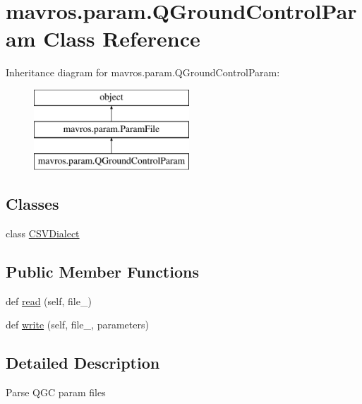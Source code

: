 \hypertarget{classmavros_1_1param_1_1QGroundControlParam}{}\section{mavros.\+param.\+Q\+Ground\+Control\+Param Class Reference}
\label{classmavros_1_1param_1_1QGroundControlParam}
Inheritance diagram for mavros.\+param.\+Q\+Ground\+Control\+Param\+:\begin{figure}[H]
\begin{center}
\leavevmode
\includegraphics[height=3.000000cm]{classmavros_1_1param_1_1QGroundControlParam}
\end{center}
\end{figure}
\subsection*{Classes}
\begin{DoxyCompactItemize}
\item 
class \mbox{\hyperlink{classmavros_1_1param_1_1QGroundControlParam_1_1CSVDialect}{C\+S\+V\+Dialect}}
\end{DoxyCompactItemize}
\subsection*{Public Member Functions}
\begin{DoxyCompactItemize}
\item 
def \mbox{\hyperlink{classmavros_1_1param_1_1QGroundControlParam_af1e7488ab8a9b48f3eddd07307a8f74e}{read}} (self, file\+\_\+)
\item 
def \mbox{\hyperlink{classmavros_1_1param_1_1QGroundControlParam_aa0d9f027320486aca9bbbe696c3fd994}{write}} (self, file\+\_\+, parameters)
\end{DoxyCompactItemize}


\subsection{Detailed Description}
\begin{DoxyVerb}Parse QGC param files\end{DoxyVerb}
 

